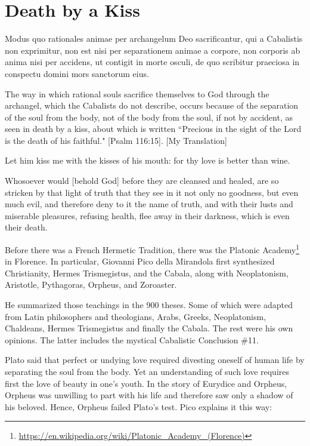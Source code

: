 \section{Death by a Kiss}

\begin{quotex}
Modus quo rationales animae per archangelum Deo sacrificantur, qui a Cabalistis non exprimitur, non est nisi per separationem animae a corpore, non corporis ab anima nisi per accidens, ut contigit in morte osculi, de quo scribitur praeciosa in conspectu domini mors sanctorum eius. 

The way in which rational souls sacrifice themselves to God through the archangel, which the Cabalists do not describe, occurs because of the separation of the soul from the body, not of the body from the soul, if not by accident, as seen in death by a kiss, about which is written ``Precious in the sight of the Lord is the death of his faithful." [Psalm 116:15]. [My Translation]

Let him kiss me with the kisses of his mouth: for thy love is better than wine. 

Whosoever would [behold God] before they are cleansed and healed, are so stricken by that light of truth that they see in it not only no goodness, but even much evil, and therefore deny to it the name of truth, and with their lusts and miserable pleasures, refusing health, flee away in their darkness, which is even their death. 

\end{quotex}
Before there was a French Hermetic Tradition, there was the Platonic Academy\footnote{\url{https://en.wikipedia.org/wiki/Platonic_Academy_(Florence)}} in Florence. In particular, Giovanni Pico della Mirandola first synthesized Christianity, Hermes Trismegistus, and the Cabala, along with Neoplatonism, Aristotle, Pythagoras, Orpheus, and Zoroaster.

He summarized those teachings in the 900 theses. Some of which were adapted from Latin philosophers and theologians, Arabs, Greeks, Neoplatonism, Chaldeans, Hermes Trismegistus and finally the Cabala. The rest were his own opinions. The latter includes the mystical Cabalistic Conclusion \#11.

Plato said that perfect or undying love required divesting oneself of human life by separating the soul from the body. Yet an understanding of such love requires first the love of beauty in one's youth. In the story of Eurydice and Orpheus, Orpheus was unwilling to part with his life and therefore saw only a shadow of his beloved. Hence, Orpheus failed Plato's test. Pico explains it this way:

